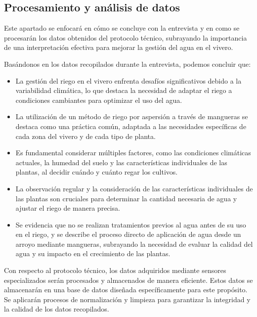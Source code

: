 \subsection{Procesamiento y análisis de datos}
Este apartado se enfocará en cómo se concluye con la entrevista y en como se procesarán los datos obtenidos del protocolo técnico, subrayando la importancia de una interpretación efectiva para mejorar la gestión del agua en el vivero.

\bigbreak
Basándonos en los datos recopilados durante la entrevista, podemos concluir que:
\begin{itemize}
    \item La gestión del riego en el vivero enfrenta desafíos significativos debido a la variabilidad climática, lo que destaca la necesidad de adaptar el riego a condiciones cambiantes para optimizar el uso del agua.
    \item La utilización de un método de riego por aspersión a través de mangueras se destaca como una práctica común, adaptada a las necesidades específicas de cada zona del vivero y de cada tipo de planta.
    \item Es fundamental considerar múltiples factores, como las condiciones climáticas actuales, la humedad del suelo y las características individuales de las plantas, al decidir cuándo y cuánto regar los cultivos.
    \item La observación regular y la consideración de las características individuales de las plantas son cruciales para determinar la cantidad necesaria de agua y ajustar el riego de manera precisa.
    \item Se evidencia que no se realizan tratamientos previos al agua antes de su uso en el riego, y se describe el proceso directo de aplicación de agua desde un arroyo mediante mangueras, subrayando la necesidad de evaluar la calidad del agua y su impacto en el crecimiento de las plantas.
\end{itemize}


\bigbreak
Con respecto al protocolo técnico, los datos adquiridos mediante sensores especializados serán procesados y almacenados de manera eficiente. Estos datos se almacenarán en una base de datos diseñada específicamente para este propósito. Se aplicarán procesos de normalización y limpieza para garantizar la integridad y la calidad de los datos recopilados.



